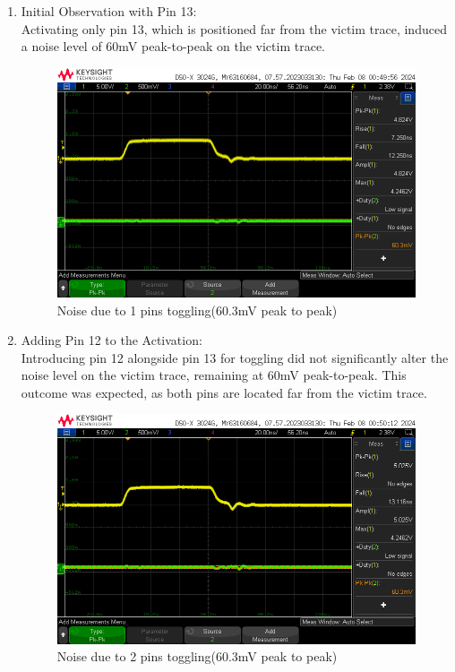 \documentclass[a4paper,11pt]{article}%
\begin{document}
\begin{enumerate}
	\item Initial Observation with Pin 13:\\ Activating only pin 13, which is positioned far from the victim trace, induced a noise level of 60mV peak-to-peak on the victim trace.
	\begin{figure}[H]
		\centering
		\includegraphics[scale=0.5]{figures/noise_plane_1.png}
		\caption{Noise due to 1 pins toggling(60.3mV peak to peak)}
		\label{noise_plane_1}
	\end{figure}

	\item Adding Pin 12 to the Activation:\\ Introducing pin 12 alongside pin 13 for toggling did not significantly alter the noise level on the victim trace, remaining at 60mV peak-to-peak. This outcome was expected, as both pins are located far from the victim trace.
	\begin{figure}[H]
		\centering
		\includegraphics[scale=0.5]{figures/noise_plane_2.png}
		\caption{Noise due to 2 pins toggling(60.3mV peak to peak)}
		\label{noise_plane_2}
	\end{figure}
	

\end{enumerate}
\end{document}
